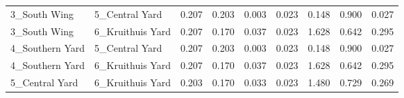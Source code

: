 \begin{tabular}{llrrrrrrr}
    3\_South Wing &    5\_Central Yard &    0.207 &    0.203 &  0.003 &  0.023 &  0.148 &    0.900 &   0.027 \\
    3\_South Wing &  6\_Kruithuis Yard &    0.207 &    0.170 &  0.037 &  0.023 &  1.628 &    0.642 &   0.295 \\
 4\_Southern Yard &    5\_Central Yard &    0.207 &    0.203 &  0.003 &  0.023 &  0.148 &    0.900 &   0.027 \\
 4\_Southern Yard &  6\_Kruithuis Yard &    0.207 &    0.170 &  0.037 &  0.023 &  1.628 &    0.642 &   0.295 \\
  5\_Central Yard &  6\_Kruithuis Yard &    0.203 &    0.170 &  0.033 &  0.023 &  1.480 &    0.729 &   0.269 \\
\bottomrule
\end{tabular}
